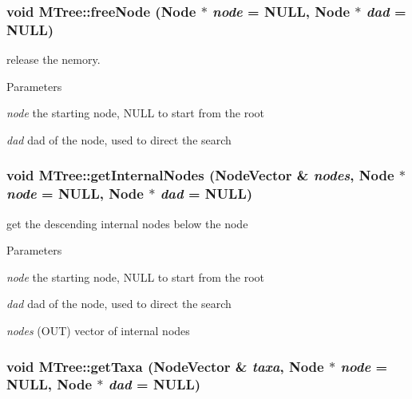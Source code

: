 \hypertarget{classMTree_ad81304aa2535e3e43f28eadcb5471c07}{
\subsubsection[{freeNode}]{\setlength{\rightskip}{0pt plus 5cm}void MTree::freeNode ({\bf Node} $\ast$ {\em node} = {\ttfamily NULL}, \/  {\bf Node} $\ast$ {\em dad} = {\ttfamily NULL})}}
\label{classMTree_ad81304aa2535e3e43f28eadcb5471c07}
release the nemory. 
\begin{DoxyParams}{Parameters}
\item[{\em node}]the starting node, NULL to start from the root \item[{\em dad}]dad of the node, used to direct the search \end{DoxyParams}
\hypertarget{classMTree_a26dd819152fe104a747b279619c0e844}{
\subsubsection[{getInternalNodes}]{\setlength{\rightskip}{0pt plus 5cm}void MTree::getInternalNodes (NodeVector \& {\em nodes}, \/  {\bf Node} $\ast$ {\em node} = {\ttfamily NULL}, \/  {\bf Node} $\ast$ {\em dad} = {\ttfamily NULL})}}
\label{classMTree_a26dd819152fe104a747b279619c0e844}
get the descending internal nodes below the node 
\begin{DoxyParams}{Parameters}
\item[{\em node}]the starting node, NULL to start from the root \item[{\em dad}]dad of the node, used to direct the search \item[{\em nodes}](OUT) vector of internal nodes \end{DoxyParams}
\hypertarget{classMTree_af8a50c7ddd8edaf62e10c14e719c6b05}{
\subsubsection[{getTaxa}]{\setlength{\rightskip}{0pt plus 5cm}void MTree::getTaxa (NodeVector \& {\em taxa}, \/  {\bf Node} $\ast$ {\em node} = {\ttfamily NULL}, \/  {\bf Node} $\ast$ {\em dad} = {\ttfamily NULL})}}
\label{classMTree_af8a50c7ddd8edaf62e10c14e719c6b05}
